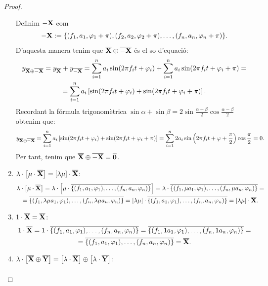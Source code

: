\documentclass{article}
\theoremstyle{definition}
\newcommand{\0}{\ensuremath{\vb{0}}}
\newcommand{\X}{\ensuremath{\vb{X}}}
\newcommand{\Y}{\ensuremath{\vb{Y}}}
\begin{document}
\begin{proof}
\begin{enumerate}
        Definim $-\X$ com $$-\X:=\{(f_1,a_1,\varphi_1+\pi),(f_2,a_2,\varphi_2+\pi),\ldots,(f_n,a_n,\varphi_n+\pi)\}.$$ D'aquesta manera tenim que $\overline{\X}\oplus\overline{-\X}$ és el so d'equació:
        \begin{multline*}
            y_{\overline{\X}\oplus\overline{-\X}}=y_{\overline{\X}}+y_{\overline{-\X}}=\sum_{i=1}^na_i\sin(2\pi f_it+\varphi_i)+\sum_{i=1}^na_i\sin(2\pi f_it+\varphi_i+\pi)=\\=\sum_{i=1}^na_i\left[\sin(2\pi f_it+\varphi_i)+\sin(2\pi f_it+\varphi_i+\pi)\right].
        \end{multline*}
        Recordant la fórmula trigonomètrica $\sin\alpha+\sin\beta=2\sin\frac{\alpha+\beta}{2}\cos\frac{\alpha-\beta}{2}$ obtenim que: $$y_{\overline{\X}\oplus\overline{-\X}}=\sum_{i=1}^na_i\left[\sin(2\pi f_it+\varphi_i)+\sin(2\pi f_it+\varphi_i+\pi)\right]=\sum_{i=1}^n2a_i\sin\left(2\pi f_it+\varphi +\frac{\pi}{2}\right)\cos\frac{\pi}{2}=0.$$ Per tant, tenim que $\overline{\X}\oplus\overline{-\X}=\overline{\0}$.
        \item $\lambda\cdot\left[\mu\cdot \overline{\X}\right]=[\lambda\mu]\cdot \overline{\X}$:
        \begin{multline*}
            \lambda\cdot\left[\mu\cdot \overline{\X}\right]=\lambda\cdot\left[\mu\cdot\overline{\{(f_1,a_1,\varphi_1),\ldots,(f_n,a_n,\varphi_n)\}}\right]=\lambda\cdot\overline{\{(f_1,\mu a_1,\varphi_1),\ldots,(f_n,\mu a_n,\varphi_n)\}}=\\=\overline{\{(f_1,\lambda\mu a_1,\varphi_1),\ldots,(f_n,\lambda\mu a_n,\varphi_n)\}}=[\lambda\mu]\cdot\overline{\{(f_1,a_1,\varphi_1),\ldots,(f_n,a_n,\varphi_n)\}}=[\lambda\mu]\cdot \overline{\X}.
        \end{multline*}
        \item $1\cdot \overline{\X}=\overline{\X}$:
        \begin{multline*}
            1\cdot\overline{\X}=1\cdot\overline{\{(f_1,a_1,\varphi_1),\ldots,(f_n,a_n,\varphi_n)\}}=\overline{\{(f_1,1a_1,\varphi_1),\ldots,(f_n,1a_n,\varphi_n)\}}=\\=\overline{\{(f_1,a_1,\varphi_1),\ldots,(f_n,a_n,\varphi_n)\}}=\overline{\X}.
        \end{multline*}
        \item $\lambda\cdot\left[\overline{\X}\oplus\overline{\Y}\right]=\left[\lambda\cdot \overline{\X}\right]\oplus\left[\lambda\cdot \overline{\Y}\right]$:
        \begin{multline*}

\end{multline*}
\end{enumerate}
\end{proof}
\end{document}
